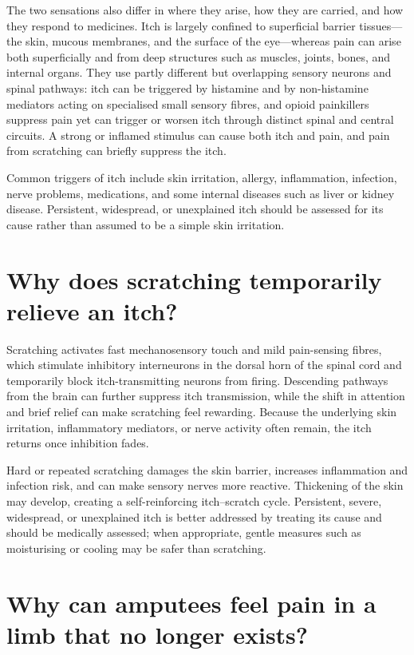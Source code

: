 \documentclass[11pt,oneside]{report}
\begin{document}
The two sensations also differ in where they arise, how they are carried, and
how they respond to medicines. Itch is largely confined to superficial barrier
tissues---the skin, mucous membranes, and the surface of the eye---whereas pain
can arise both superficially and from deep structures such as muscles, joints,
bones, and internal organs. They use partly different but overlapping sensory
neurons and spinal pathways: itch can be triggered by histamine and by
non-histamine mediators acting on specialised small sensory fibres, and opioid
painkillers suppress pain yet can trigger or worsen itch through distinct spinal
and central circuits. A strong or inflamed stimulus can cause both itch and
pain, and pain from scratching can briefly suppress the itch.

Common triggers of itch include skin irritation, allergy, inflammation,
infection, nerve problems, medications, and some internal diseases such as liver
or kidney disease. Persistent, widespread, or unexplained itch should be
assessed for its cause rather than assumed to be a simple skin irritation.

\section{Why does scratching temporarily relieve an itch?}

Scratching activates fast mechanosensory touch and mild pain-sensing fibres,
which stimulate inhibitory interneurons in the dorsal horn of the spinal cord
and temporarily block itch-transmitting neurons from firing. Descending
pathways from the brain can further suppress itch transmission, while the
shift in attention and brief relief can make scratching feel rewarding. Because
the underlying skin irritation, inflammatory mediators, or nerve activity
often remain, the itch returns once inhibition fades.

Hard or repeated scratching damages the skin barrier, increases inflammation
and infection risk, and can make sensory nerves more reactive. Thickening of
the skin may develop, creating a self-reinforcing itch--scratch cycle. Persistent,
severe, widespread, or unexplained itch is better addressed by treating its
cause and should be medically assessed; when appropriate, gentle measures such
as moisturising or cooling may be safer than scratching.

\section{Why can amputees feel pain in a limb that no longer exists?}
\end{document}
